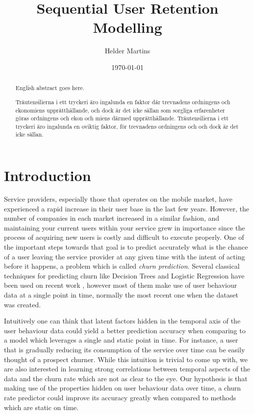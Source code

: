 \documentclass{kththesis}
\title{Sequential User Retention Modelling}
\author{Helder Martins}
\date{\today}
\begin{document}
\flyleaf

\begin{abstract}
  English abstract goes here.
  \lipsum[1-2]
\end{abstract}

\clearpage

\begin{otherlanguage}{swedish}
  \begin{abstract}
    Träutensilierna i ett tryckeri äro ingalunda en faktor där
    trevnadens ordningens och ekonomiens upprätthållande, och dock är
    det icke sällan som sorgliga erfarenheter göras ordningens och
    ekon och miens därmed upprätthållande. Träutensilierna i ett
    tryckeri äro ingalunda en oviktig faktor, för trevnadens
    ordningens och och dock är det icke sällan.
  \end{abstract}
\end{otherlanguage}

\cleardoublepage

\tableofcontents


\mainmatter


\chapter{Introduction}

    Service providers, especially those that operates on the mobile market, have experienced a rapid increase in their user base in the last few years. However, the number of companies in each market increased in a similar fashion, and maintaining your current users within your service grew in importance since the process of acquiring new users is costly and difficult to execute properly. One of the important steps towards that goal is to predict accurately what is the chance of a user leaving the service provider at any given time with the intent of acting before it happens, a problem which is called \emph{churn prediction}. Several classical techniques for predicting churn like Decision Trees and Logistic Regression have been used on recent work \cite{Lazarov2007}, however most of them make use of user behaviour data at a single point in time, normally the most recent one when the dataset was created. 
    
    Intuitively one can think that latent factors hidden in the temporal axis of the user behaviour data could yield a better prediction accuracy when comparing to a model which leverages a single and static point in time. For instance, a user that is gradually reducing its consumption of the service over time can be easily thought of a prospect churner. While this intuition is trivial to come up with, we are also interested in learning strong correlations between temporal aspects of the data and the churn rate which are not as clear to the eye. Our hypothesis is that making use of the properties hidden on user behaviour data over time, a churn rate predictor could improve its accuracy greatly when compared to methods which are static on time.
       
\end{document}
